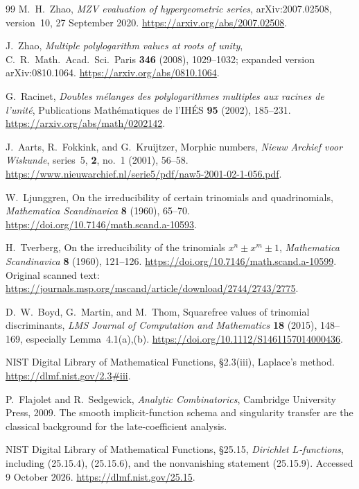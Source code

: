 \begin{thebibliography}{99}
M.~H.~Zhao, \emph{MZV evaluation of hypergeometric series},
arXiv:2007.02508, version~10, 27 September 2020.
\url{https://arxiv.org/abs/2007.02508}.

J.~Zhao, \emph{Multiple polylogarithm values at roots of unity},
C.~R.~Math.~Acad.~Sci.~Paris \textbf{346} (2008), 1029--1032;
expanded version arXiv:0810.1064.
\url{https://arxiv.org/abs/0810.1064}.

G.~Racinet, \emph{Doubles m\'elanges des polylogarithmes multiples aux
racines de l'unit\'e}, Publications Math\'ematiques de l'IH\'ES
\textbf{95} (2002), 185--231.
\url{https://arxiv.org/abs/math/0202142}.

J.~Aarts, R.~Fokkink, and G.~Kruijtzer, Morphic numbers,
\emph{Nieuw Archief voor Wiskunde}, series~5, \textbf{2}, no.~1
(2001), 56--58.
\url{https://www.nieuwarchief.nl/serie5/pdf/naw5-2001-02-1-056.pdf}.

W.~Ljunggren, On the irreducibility of certain trinomials and
quadrinomials, \emph{Mathematica Scandinavica} \textbf{8} (1960),
65--70. \url{https://doi.org/10.7146/math.scand.a-10593}.

H.~Tverberg, On the irreducibility of the trinomials
$x^n\pm x^m\pm1$, \emph{Mathematica Scandinavica} \textbf{8}
(1960), 121--126.
\url{https://doi.org/10.7146/math.scand.a-10599}.
Original scanned text:
\url{https://journals.msp.org/mscand/article/download/2744/2743/2775}.

D.~W.~Boyd, G.~Martin, and M.~Thom,
Squarefree values of trinomial discriminants,
\emph{LMS Journal of Computation and Mathematics} \textbf{18}
(2015), 148--169, especially Lemma~4.1(a),(b).
\url{https://doi.org/10.1112/S1461157014000436}.

NIST Digital Library of Mathematical Functions,
\S2.3(iii), Laplace's method.
\url{https://dlmf.nist.gov/2.3#iii}.

P.~Flajolet and R.~Sedgewick,
\emph{Analytic Combinatorics}, Cambridge University Press, 2009.
The smooth implicit-function schema and singularity transfer are the
classical background for the late-coefficient analysis.

NIST Digital Library of Mathematical Functions, \S25.15,
\emph{Dirichlet $L$-functions}, including (25.15.4), (25.15.6),
and the nonvanishing statement (25.15.9). Accessed 9 October 2026.
\url{https://dlmf.nist.gov/25.15}.


\end{thebibliography}
